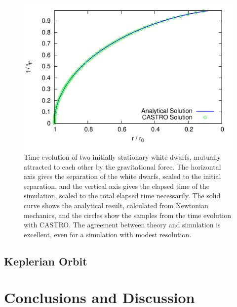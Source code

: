 \documentclass[12pt,preprint]{aastex}
\begin{document}
\begin{figure}
  \centering
  \includegraphics[scale=2.0]{freefall/plot_freefall}
  \caption{Time evolution of two initially stationary white dwarfs,
    mutually attracted to each other by the gravitational force. The
    horizontal axis gives the separation of the white dwarfs, scaled
    to the initial separation, and the vertical axis gives the elapsed
    time of the simulation, scaled to the total elapsed time
    necessarily. The solid curve shows the analytical result,
    calculated from Newtonian mechanics, and the circles show the
    samples from the time evolution with CASTRO. The agreement between
    theory and simulation is excellent, even for a simulation with
    modest resolution.}
  \label{Fig:Free Fall}
\end{figure}

\subsection{Keplerian Orbit}\label{Sec:Kepler}

\section{Conclusions and Discussion}\label{Sec:Conclusions and Discussion}


\acknowledgments


\clearpage



\end{document}
